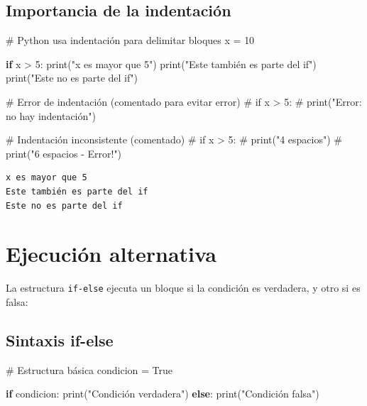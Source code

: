 \documentclass[
  doc,
  floatsintext,
  longtable,
  a4paper,
  nolmodern,
  notxfonts,
  notimes,
  12pt,
  colorlinks=true,linkcolor=blue,citecolor=blue,urlcolor=blue]{apa7}
\newenvironment{Shaded}{\begin{snugshade}}{\end{snugshade}}
\newcommand{\BuiltInTok}[1]{\textcolor[rgb]{0.00,0.23,0.31}{#1}}
\newcommand{\CommentTok}[1]{\textcolor[rgb]{0.37,0.37,0.37}{#1}}
\newcommand{\ControlFlowTok}[1]{\textcolor[rgb]{0.00,0.23,0.31}{\textbf{#1}}}
\newcommand{\DecValTok}[1]{\textcolor[rgb]{0.68,0.00,0.00}{#1}}
\newcommand{\NormalTok}[1]{\textcolor[rgb]{0.00,0.23,0.31}{#1}}
\newcommand{\OperatorTok}[1]{\textcolor[rgb]{0.37,0.37,0.37}{#1}}
\newcommand{\StringTok}[1]{\textcolor[rgb]{0.13,0.47,0.30}{#1}}
\newcommand{\VariableTok}[1]{\textcolor[rgb]{0.07,0.07,0.07}{#1}}
\begin{document}
\subsection{Importancia de la
indentación}\label{importancia-de-la-indentaciuxf3n}

\begin{Shaded}
\begin{Highlighting}[]
\CommentTok{\# Python usa indentación para delimitar bloques}
\NormalTok{x }\OperatorTok{=} \DecValTok{10}

\ControlFlowTok{if}\NormalTok{ x }\OperatorTok{\textgreater{}} \DecValTok{5}\NormalTok{:}
    \BuiltInTok{print}\NormalTok{(}\StringTok{"x es mayor que 5"}\NormalTok{)}
    \BuiltInTok{print}\NormalTok{(}\StringTok{"Este también es parte del if"}\NormalTok{)}
\BuiltInTok{print}\NormalTok{(}\StringTok{"Este no es parte del if"}\NormalTok{)}

\CommentTok{\# Error de indentación (comentado para evitar error)}
\CommentTok{\# if x \textgreater{} 5:}
\CommentTok{\# print("Error: no hay indentación")}

\CommentTok{\# Indentación inconsistente (comentado)}
\CommentTok{\# if x \textgreater{} 5:}
\CommentTok{\#     print("4 espacios")}
\CommentTok{\#       print("6 espacios {-} Error!")}
\end{Highlighting}
\end{Shaded}

\begin{verbatim}
x es mayor que 5
Este también es parte del if
Este no es parte del if
\end{verbatim}

\section{Ejecución alternativa}\label{ejecuciuxf3n-alternativa}

La estructura \texttt{if-else} ejecuta un bloque si la condición es
verdadera, y otro si es falsa:

\subsection{Sintaxis if-else}\label{sintaxis-if-else}

\begin{Shaded}
\begin{Highlighting}[]
\CommentTok{\# Estructura básica}
\NormalTok{condicion }\OperatorTok{=} \VariableTok{True}

\ControlFlowTok{if}\NormalTok{ condicion:}
    \BuiltInTok{print}\NormalTok{(}\StringTok{"Condición verdadera"}\NormalTok{)}
\ControlFlowTok{else}\NormalTok{:}
    \BuiltInTok{print}\NormalTok{(}\StringTok{"Condición falsa"}\NormalTok{)}
\end{Highlighting}
\end{Shaded}
\end{document}
